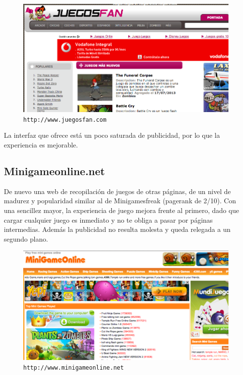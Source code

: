 \begin{figure}[h]
  \begin{center}
    \includegraphics[width=\textwidth]{images/juegosfan.png}
    \caption{{\tt http://www.juegosfan.com}}
    \label{fig::juegosfan}
  \end{center}
\end{figure}

La interfaz que ofrece está un poco saturada de publicidad, por lo que la experiencia es mejorable.

\subsection*{Minigameonline.net}

De nuevo una web de recopilación de juegos de otras páginas, de un nivel de madurez y popularidad similar al de Minigamesfreak (pagerank de 2/10). Con una sencillez mayor, la experiencia de juego mejora frente al primero, dado que cargar cualquier juego es inmediato y no te obliga a pasar por páginas intermedias. Además la publicidad no resulta molesta y queda relegada a un segundo plano.

\begin{figure}[h]
  \begin{center}
    \includegraphics[width=\textwidth]{images/minigameonline.png}
    \caption{{\tt http://www.minigameonline.net}}
    \label{fig::minigameonline}
  \end{center}
\end{figure}

